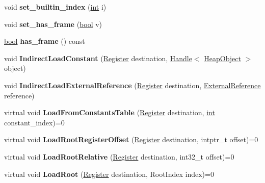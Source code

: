 \begin{DoxyCompactItemize}
void {\bfseries set\+\_\+builtin\+\_\+index} (\mbox{\hyperlink{classint}{int}} i)
\item 
\mbox{\label{classv8_1_1internal_1_1TurboAssemblerBase_a8919061799aa8c75378144ada41caf25}} 
void {\bfseries set\+\_\+has\+\_\+frame} (\mbox{\hyperlink{classbool}{bool}} v)
\item 
\mbox{\label{classv8_1_1internal_1_1TurboAssemblerBase_a0e2fa1045487fb57adc8bd8f8e34679a}} 
\mbox{\hyperlink{classbool}{bool}} {\bfseries has\+\_\+frame} () const
\item 
\mbox{\label{classv8_1_1internal_1_1TurboAssemblerBase_ae167b194ac5b1343ad9ea66f9c7cd070}} 
void {\bfseries Indirect\+Load\+Constant} (\mbox{\hyperlink{classv8_1_1internal_1_1Register}{Register}} destination, \mbox{\hyperlink{classv8_1_1internal_1_1Handle}{Handle}}$<$ \mbox{\hyperlink{classv8_1_1internal_1_1HeapObject}{Heap\+Object}} $>$ object)
\item 
\mbox{\label{classv8_1_1internal_1_1TurboAssemblerBase_a4de4e81c941b7a7c699950f3941af1ba}} 
void {\bfseries Indirect\+Load\+External\+Reference} (\mbox{\hyperlink{classv8_1_1internal_1_1Register}{Register}} destination, \mbox{\hyperlink{classv8_1_1internal_1_1ExternalReference}{External\+Reference}} reference)
\item 
\mbox{\label{classv8_1_1internal_1_1TurboAssemblerBase_a7dc4ee2f26c1512c546108c792125ac7}} 
virtual void {\bfseries Load\+From\+Constants\+Table} (\mbox{\hyperlink{classv8_1_1internal_1_1Register}{Register}} destination, \mbox{\hyperlink{classint}{int}} constant\+\_\+index)=0
\item 
\mbox{\label{classv8_1_1internal_1_1TurboAssemblerBase_a6cb9080925cfa496e02e638b74ed7431}} 
virtual void {\bfseries Load\+Root\+Register\+Offset} (\mbox{\hyperlink{classv8_1_1internal_1_1Register}{Register}} destination, intptr\+\_\+t offset)=0
\item 
\mbox{\label{classv8_1_1internal_1_1TurboAssemblerBase_adde5e72f473c50bd14429ded6cd07249}} 
virtual void {\bfseries Load\+Root\+Relative} (\mbox{\hyperlink{classv8_1_1internal_1_1Register}{Register}} destination, int32\+\_\+t offset)=0
\item 
\mbox{\label{classv8_1_1internal_1_1TurboAssemblerBase_a86931008e540e31af7d212c72edd4bc7}} 
virtual void {\bfseries Load\+Root} (\mbox{\hyperlink{classv8_1_1internal_1_1Register}{Register}} destination, Root\+Index index)=0
\end{DoxyCompactItemize}

